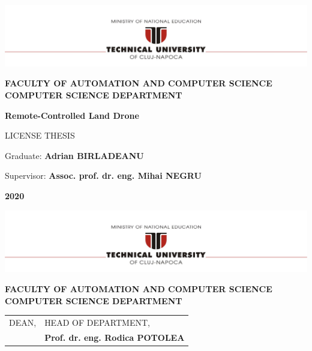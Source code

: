 \documentclass[12pt,a4paper,twoside]{report}
\renewcommand{\thesisyear}{2020}      %
\renewcommand{\thesistitle}{Remote-Controlled Land Drone}
\renewcommand{\thesissupervisor}{Assoc. prof. dr. eng.  Mihai NEGRU}
\newcommand{\department}{\bf FACULTY OF AUTOMATION AND COMPUTER SCIENCE\\
COMPUTER SCIENCE DEPARTMENT}
\newcommand{\utcnlogo}{\includegraphics[width=15cm]{img/tucn.jpg}}
\begin{document}

\newenvironment{definition}[1][Defini\c{t}ie.]{\begin{trivlist}
\item[\hskip \labelsep {\bfseries #1}]}{\end{trivlist}}




\setcounter{page}{1}



\begin{center}
\utcnlogo

\department

\vspace{4cm}

{\bf \thesistitle} %

\vspace{1.5cm}

LICENSE THESIS

\vspace{6cm}

Graduate: {\bf Adrian BIRLADEANU}

Supervisor: {\bf \thesissupervisor}

\vspace{3cm}
{\bf \thesisyear}
\end{center}

\thispagestyle{empty}
\newpage

\begin{center}
\utcnlogo

\department

\end{center}
\vspace{0.5cm}

\begin{tabular}{p{7cm}p{8cm}}
 \hspace{-1cm}DEAN, & HEAD OF DEPARTMENT,\\
 \hspace{-1cm}{\bf Prof. dr. eng. Liviu MICLEA} & {\bf Prof. dr. eng. Rodica POTOLEA}\\  
\end{tabular}
 
\end{document}
